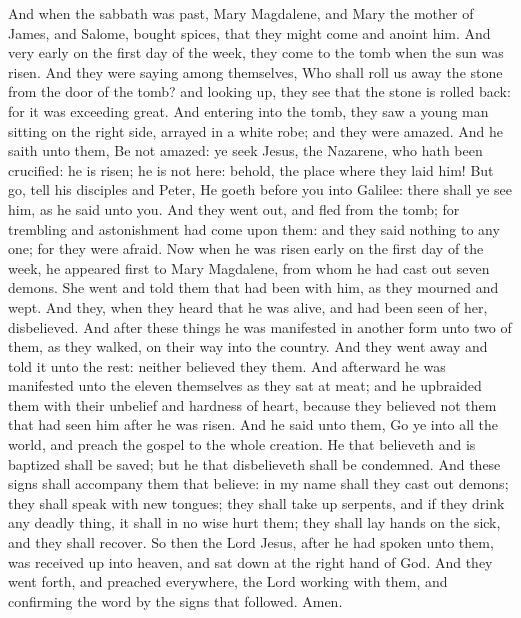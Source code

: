 And when the sabbath was past, Mary Magdalene, and Mary the mother of James, and Salome, bought spices, that they might come and anoint him. And very early on the first day of the week, they come to the tomb when the sun was risen. And they were saying among themselves, Who shall roll us away the stone from the door of the tomb? and looking up, they see that the stone is rolled back: for it was exceeding great. And entering into the tomb, they saw a young man sitting on the right side, arrayed in a white robe; and they were amazed. And he saith unto them, Be not amazed: ye seek Jesus, the Nazarene, who hath been crucified: he is risen; he is not here: behold, the place where they laid him! But go, tell his disciples and Peter, He goeth before you into Galilee: there shall ye see him, as he said unto you. And they went out, and fled from the tomb; for trembling and astonishment had come upon them: and they said nothing to any one; for they were afraid.  Now when he was risen early on the first day of the week, he appeared first to Mary Magdalene, from whom he had cast out seven demons. She went and told them that had been with him, as they mourned and wept. And they, when they heard that he was alive, and had been seen of her, disbelieved.  And after these things he was manifested in another form unto two of them, as they walked, on their way into the country. And they went away and told it unto the rest: neither believed they them.  And afterward he was manifested unto the eleven themselves as they sat at meat; and he upbraided them with their unbelief and hardness of heart, because they believed not them that had seen him after he was risen. And he said unto them, Go ye into all the world, and preach the gospel to the whole creation. He that believeth and is baptized shall be saved; but he that disbelieveth shall be condemned. And these signs shall accompany them that believe: in my name shall they cast out demons; they shall speak with new tongues; they shall take up serpents, and if they drink any deadly thing, it shall in no wise hurt them; they shall lay hands on the sick, and they shall recover.  So then the Lord Jesus, after he had spoken unto them, was received up into heaven, and sat down at the right hand of God. And they went forth, and preached everywhere, the Lord working with them, and confirming the word by the signs that followed. Amen. 